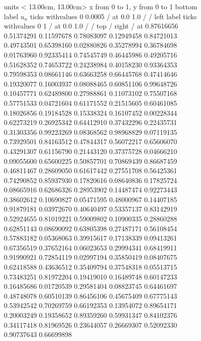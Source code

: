 
\def\fiverm {}%
  
\begin{figure} \centering \beginpicture
\setcoordinatesystem units < 13.00cm, 13.00cm>
\setplotarea x from 0 to 1, y from 0 to 1
\axis bottom
  label $u_{n}$
  ticks withvalues        0   0.0005  / at 0.0 1.0 / /
\axis left
  label 
  ticks withvalues         0        1  / at 0.0 1.0 / /
\axis top /  \axis right /
 at
   0.87616656   0.51374291
   0.11597678   0.78083097
   0.12949458   0.84721013
   0.49743501   0.65398160
   0.02880826   0.35278994
   0.36784698   0.01763960
   0.92335414   0.74545749
   0.46445986   0.49205716
   0.51628352   0.74653722
   0.24238984   0.40158230
   0.93364353   0.79598353
   0.08661146   0.63663258
   0.66445768   0.47414646
   0.19320077   0.16003937
   0.08088465   0.60851106
   0.99648726   0.10457771
   0.62489800   0.27988861
   0.11073102   0.75507168
   0.57751533   0.04721604
   0.61171552   0.21515605
   0.60461085   0.18026856
   0.19184528   0.15338324
   0.16107452   0.00228344
   0.62273219   0.26925342
   0.64412910   0.37432296
   0.22435731   0.31303356
   0.99223269   0.08368562
   0.98968829   0.07119135
   0.73929501   0.84163512
   0.47844317   0.56072217
   0.65606070   0.43291307
   0.61156790   0.21443120
   0.37375728   0.04666210
   0.09055600   0.65600225
   0.50857701   0.70869439
   0.86687459   0.46811467
   0.28609050   0.61617442
   0.27551708   0.56425361
   0.74290852   0.85937930
   0.17820616   0.08640836
   0.17825724   0.08665916
   0.62686326   0.28953902
   0.14487474   0.92273443
   0.38602612   0.10690827
   0.05471595   0.48000967
   0.14407185   0.91879181
   0.03972670   0.40640497
   0.53357137   0.83142919
   0.52924655   0.81019221
   0.59009802   0.10900335
   0.28860288   0.62851143
   0.08690092   0.63805398
   0.27487171   0.56108454
   0.57883182   0.05368063
   0.39915617   0.17138339
   0.09413261   0.67356519
   0.37652164   0.06023653
   0.29994341   0.68419911
   0.91990921   0.72854119
   0.02997194   0.35850419
   0.08407675   0.62418588
   0.43636512   0.35409794
   0.37548318   0.05513715
   0.73483251   0.81972204
   0.19419010   0.16489748
   0.60147233   0.16485686
   0.01720539   0.29581404
   0.08823745   0.64461697
   0.48748078   0.60510139
   0.86456106   0.45675409
   0.67775143   0.53942542
   0.70269759   0.66192353
   0.13954072   0.89654171
   0.20003249   0.19358652
   0.89359260   0.59931347
   0.84102376   0.34117418
   0.81969526   0.23644057
   0.26669307   0.52092330
   0.90737643   0.66699898

\end{figure}
